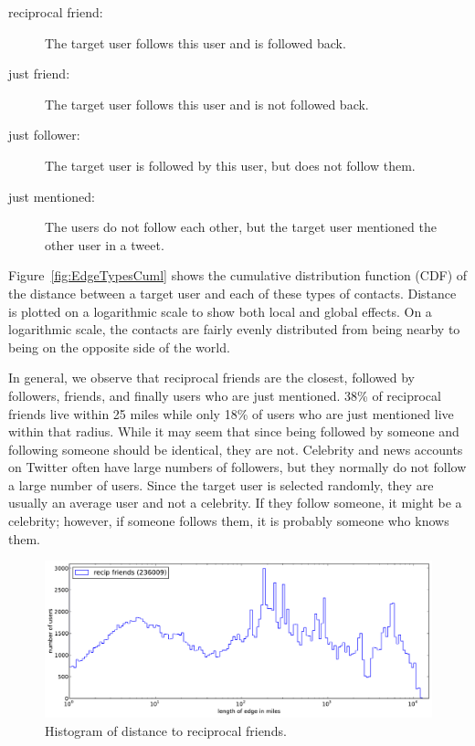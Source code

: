 \documentclass[letterpaper]{article}
\begin{document}
\begin{description}
\item[reciprocal friend:] The target user follows this user and is followed
    back.
\item[just friend:] The target user follows this user and is not followed
    back.
\item[just follower:] The target user is followed by this user, but does
    not follow them.
\item[just mentioned:] The users do not follow each other, but the target
    user mentioned the other user in a tweet.
\end{description}

Figure~\ref{fig:EdgeTypesCuml} shows the cumulative distribution
function (CDF) of the distance between a target user and each of these types of
contacts.
%
Distance is plotted on a logarithmic scale to show both local and
global effects.
%
On a logarithmic scale, the contacts are fairly evenly distributed from being
nearby to being on the opposite side of the world.
%
%
%

In general, we observe that reciprocal friends are the closest, followed by followers, friends,
and finally users who are just mentioned.
%
38\% of reciprocal friends live within 25 miles while only 18\% of users
who are just mentioned live within that radius.
%
While it may seem that since being followed by someone and following someone
should be identical, they are not.
%
Celebrity and news accounts on Twitter often have large numbers of followers,
but they normally do not follow a large number of users.
%
Since the target user is selected randomly, they are usually an average
user and not a celebrity.
%
If they follow someone, it might be a celebrity; however, if someone follows
them, it is probably someone who knows them.

\begin{figure}[tbh]
\centering
\includegraphics[width=.9\linewidth]{figures/rfrd_norm.pdf}
\caption{
Histogram of distance to reciprocal friends.
}
\label{fig:EdgeTypes}
\end{figure}
\end{document}

